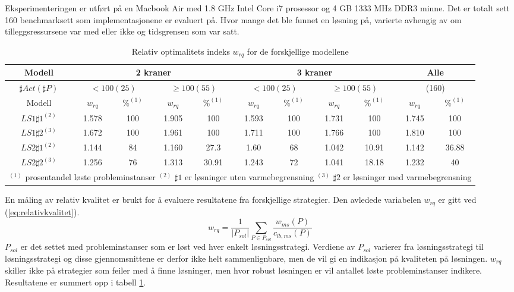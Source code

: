 Eksperimenteringen er utført på en Macbook Air med 1.8 GHz Intel Core i7 prosessor og 4 GB 1333 MHz DDR3 minne. Det er totalt sett 160 benchmarksett som implementasjonene er evaluert på. Hvor mange det ble funnet en løsning på, varierte avhengig av om tilleggsressursene var med eller ikke og tidsgrensen som var satt.

\begin{table}[h]
\caption{Relativ optimalitets indeks $w_{rq}$ for de forskjellige modellene}
\begin{center}
\begin{tabular}{ | c | c | c | c | c | c | c | c | c | c | c | }
\hline
\textbf{Modell} & \multicolumn{4}{|c|}{\textbf{2 kraner}} & \multicolumn{4}{|c|}{\textbf{3 kraner}} & \multicolumn{2}{|c|}{\textbf{Alle}} \\ \hline
$\sharp Act(\sharp P)$ & \multicolumn{2}{|c|}{$< 100 (25)$} & \multicolumn{2}{|c|}{$\ge 100 (55)$} & \multicolumn{2}{|c|}{$< 100 (25)$} & \multicolumn{2}{|c|}{$\ge 100 (55)$} & \multicolumn{2}{|c|}{(160)} \\ 
\hline
Modell & $w_{rq}$ & $\%^{(1)}$ & $w_{rq}$ & $\%^{(1)}$  & $w_{rq}$ & $\%^{(1)}$ & $w_{rq}$ & $\%^{(1)}$ & $w_{rq}$ & $\%^{(1)}$ \\ \hline
$LS1 \sharp 1^{(2)}$ & 1.578 & 100 & 1.905 & 100 & 1.593 & 100 & 1.731 & 100 & 1.745 & 100 \\
$LS1 \sharp 2^{(3)}$ & 1.672 & 100 & 1.961 & 100 & 1.711 & 100 & 1.766 & 100 & 1.810 & 100 \\
$LS2 \sharp 1^{(2)}$ & 1.144 & 84 & 1.160 & 27.3 & 1.60 & 68 & 1.042 & 10.91 & 1.142 & 36.88 \\
$LS2 \sharp 2^{(3)}$ & 1.256 & 76 & 1.313 & 30.91 & 1.243 & 72 & 1.041 & 18.18 & 1.232 & 40 \\
\hline
\multicolumn{11}{l}{\begin{minipage}{6in}$^{(1)}$ prosentandel løste probleminstanser
$^{(2)}$ $\sharp 1$ er løsninger uten varmebegrensning
$^{(3)}$ $\sharp 2$ er løsninger med varmebegrensning \end{minipage}}
\end{tabular}
\end{center}
\label{tab:resultaterSum}
\end{table}

En måling av relativ kvalitet er brukt for å evaluere resultatene fra forskjellige strategier. Den avledede variabelen $w_{rq}$ er gitt ved (\ref{eq:relativkvalitet}).
\begin{equation}
w_{rq} = \frac{1}{| P_{sol} |} \sum_{P \in P_{sol}} \frac{w_{ms}(P)}{c_{lb,ms}(P)}
\label{eq:relativkvalitet}
\end{equation}
$P_{sol}$ er det settet med probleminstanser som er løst ved hver enkelt løsningsstrategi. Verdiene av $P_{sol}$ varierer fra løsningsstrategi til løsningsstrategi og disse gjennomsnittene er derfor ikke helt sammenlignbare, men de vil gi en indikasjon på kvaliteten på løsningen. $w_{rq}$ skiller ikke på strategier som feiler med å finne løsninger, men hvor robust løsningen er vil antallet løste probleminstanser indikere. Resultatene er summert opp i tabell \ref{tab:resultaterSum}.

